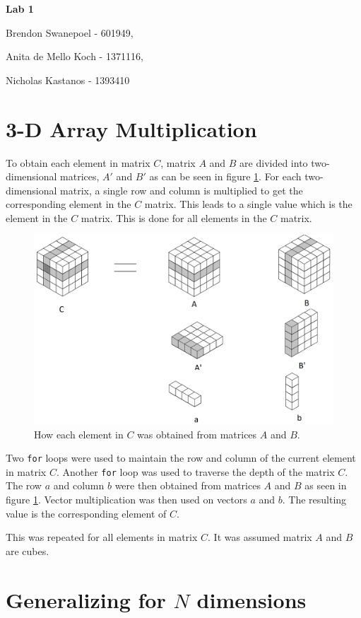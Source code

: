 \documentclass[a4paper,10pt]{article}
\begin{document}
{\LARGE{\centerline{\bf Lab 1}}}
{\Large{\centerline{Brendon Swanepoel - 601949,}
\centerline{ Anita de Mello Koch - 1371116,} 
\centerline{Nicholas Kastanos - 1393410}}}

\section{3-D Array Multiplication}

To obtain each element in matrix $C$, matrix $A$ and $B$ are divided into two-dimensional matrices, $A'$ and $B'$ as can be seen in figure \ref{3DMult}.
For each two-dimensional matrix, a single row and column is multiplied to get the corresponding element in the $C$ matrix.
This leads to a single value which is the element in the $C$ matrix.
This is done for all elements in the $C$ matrix.

\begin{figure}[h]
\centering
\includegraphics[scale=0.15]{3D.jpg}
\caption{How each element in $C$ was obtained from matrices $A$ and $B$.}\label{3DMult}
\end{figure}

Two \texttt{for} loops were used to maintain the row and column of the current element in matrix $C$.
Another \texttt{for} loop was used to traverse the depth of the matrix $C$.
The row $a$ and column $b$ were then obtained from matrices $A$ and $B$ as seen in figure \ref{3DMult}.
Vector multiplication was then used on vectors $a$ and $b$.
The resulting value is the corresponding element of $C$.

This was repeated for all elements in matrix $C$.
It was assumed matrix $A$ and $B$ are cubes.

\section{Generalizing for $N$ dimensions}
\end{document}

